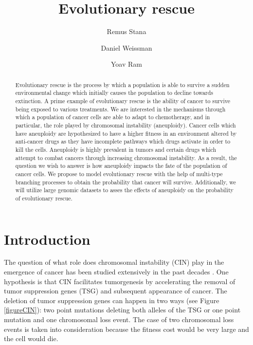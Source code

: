 \documentclass[11pt,a4paper]{article}
\begin{document}
\title{Evolutionary rescue}
\author[1]{Remus Stana}
\author[2]{‪Daniel Weissman}
\author[1]{Yoav Ram}
\maketitle
\begin{abstract}
Evolutionary rescue is the process by which a population is able to survive a sudden environmental change which initially causes the population to decline towards extinction. A prime example of evolutionary rescue is the ability of cancer to survive being exposed to various treatments. We are interested in the mechanisms through which a population of cancer cells are able to adapt to chemotherapy, and in particular, the role played by chromosomal instability (aneuploidy). Cancer cells which have aneuploidy are hypothesized to have a higher fitness in an environment altered by anti-cancer drugs as they have incomplete pathways which drugs activate in order to kill the cells. Aneuploidy is highly prevalent in tumors and certain drugs which attempt to combat cancers through increasing chromosomal instability. As a result, the question we wish to answer is how aneuploidy impacts the fate of the population of cancer cells. We propose to model evolutionary rescue with the help of multi-type branching processes to obtain the probability that cancer will survive. Additionally, we will utilize large genomic datasets to asses the effects of aneuploidy on the probability of evolutionary rescue.
\end{abstract}

\section{Introduction}
The question of what role does chromosomal instability (CIN) play in the emergence of cancer has been studied extensively in the past decades \cite{michor2005can,christine2018understanding,nowak2002role,pavelka2010dr,komarova2003mutation,zhu2018cellular}. One hypothesis is that CIN facilitates tumorgenesis by accelerating the removal of tumor suppression genes (TSG) and subsequent appearance of cancer. The deletion of tumor suppression genes can happen in two ways (see Figure \ref{figureCIN}): two point mutations deleting both alleles of the TSG or one point mutation and one chromosomal loss event. The case of two chromosomal loss events is taken into consideration because the fitness cost would be very large and the cell would die.
\end{document}
